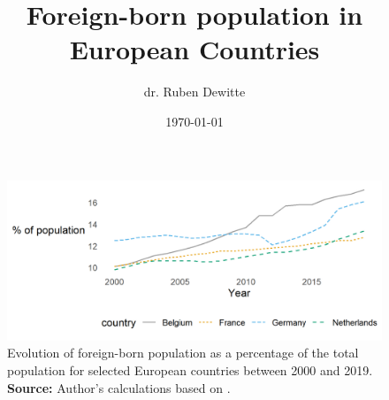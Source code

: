 \documentclass[a4paper,11pt]{article}
\title{Foreign-born population in European Countries}
\author{dr. Ruben Dewitte}
\date{\today}
\begin{document}
	\maketitle
	
	
\begin{figure}
	\centering
	\includegraphics{foreign_born.png}
	\caption{Evolution of foreign-born population as a percentage of the total population for selected European countries between 2000 and 2019. \newline
	\textbf{Source:} Author's calculations based on \citep{oecd2022foreign}.}
	\label{fig_foreign_born}
\end{figure}








	
\end{document}
